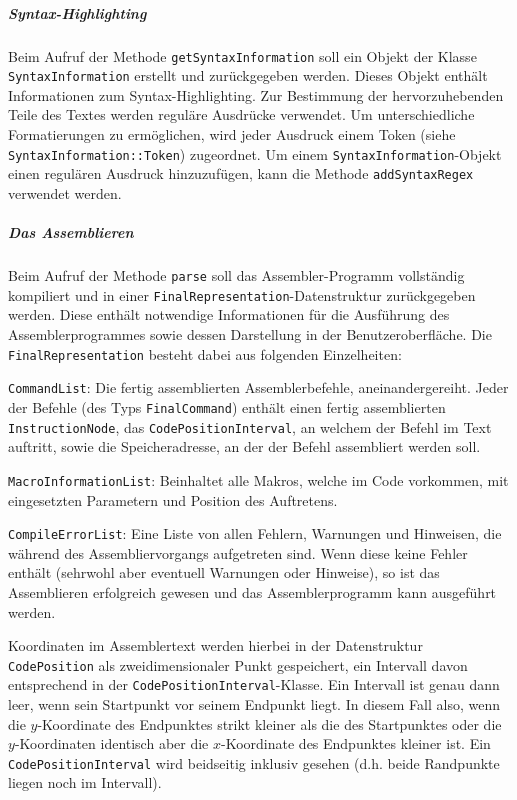 \subparagraph{Syntax-Highlighting}

Beim Aufruf der Methode \texttt{getSyntaxInformation} soll ein Objekt der Klasse
\texttt{SyntaxInformation} erstellt und zurückgegeben werden. Dieses Objekt
enthält Informationen zum Syntax-Highlighting. Zur Bestimmung der
hervorzuhebenden Teile des Textes werden reguläre Ausdrücke verwendet. Um
unterschiedliche Formatierungen zu ermöglichen, wird jeder Ausdruck einem Token
(siehe \texttt{SyntaxInformation::Token}) zugeordnet. Um einem
\texttt{SyntaxInformation}-Objekt einen regulären Ausdruck hinzuzufügen, kann
die Methode \texttt{addSyntaxRegex} verwendet werden.

\pagebreak
\subparagraph{Das Assemblieren}
\vspace{-0.2cm}

Beim Aufruf der Methode \texttt{parse} soll das Assembler-Programm vollständig
kompiliert und in einer \texttt{FinalRepresentation}-Datenstruktur zurückgegeben
werden. Diese enthält notwendige Informationen für die Ausführung des
Assemblerprogrammes sowie dessen Darstellung in der Benutzeroberfläche. Die
\texttt{FinalRepresentation} besteht dabei aus folgenden Einzelheiten:
\begin{sitemize}{-1cm}
  \item \texttt{CommandList}: Die fertig assemblierten Assemblerbefehle,
  aneinandergereiht. Jeder der Befehle (des Typs \texttt{FinalCommand}) enthält
  einen fertig assemblierten \texttt{InstructionNode}, das
  \texttt{CodePositionInterval}, an welchem der Befehl im Text auftritt, sowie
  die Speicheradresse, an der der Befehl assembliert werden soll.

  \item \texttt{MacroInformationList}: Beinhaltet alle Makros, welche im Code
  vorkommen, mit eingesetzten Parametern und Position des Auftretens.

  \item \texttt{CompileErrorList}: Eine Liste von allen Fehlern, Warnungen und
  Hinweisen, die während des Assembliervorgangs aufgetreten sind. Wenn diese
  keine Fehler enthält (sehrwohl aber eventuell Warnungen oder Hinweise), so ist
  das Assemblieren erfolgreich gewesen und das Assemblerprogramm kann ausgeführt
  werden.
  \vspace{-0.5cm}
\end{sitemize}

Koordinaten im Assemblertext werden hierbei in der Datenstruktur
\texttt{CodePosition} als zweidimensionaler Punkt gespeichert, ein Intervall
davon entsprechend in der \texttt{CodePositionInterval}-Klasse. Ein Intervall
ist genau dann leer, wenn sein Startpunkt vor seinem Endpunkt liegt. In diesem
Fall also, wenn die $y$-Koordinate des Endpunktes strikt kleiner als die des
Startpunktes oder die $y$-Koordinaten identisch aber die $x$-Koordinate des
Endpunktes kleiner ist. Ein \texttt{CodePositionInterval} wird beidseitig
inklusiv gesehen (d.h. beide Randpunkte liegen noch im Intervall).

